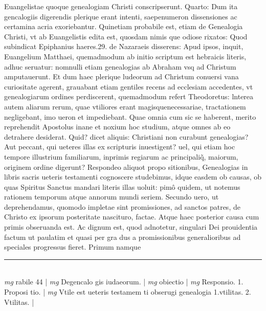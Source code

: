 \documentclass{article}
\begin{document}
\begin{pages}
Euangelistae quoque  genealogiam Christi conscripserunt. Quarto: Dum ita gencalogiis digerendis plerique  erant intenti, saepenumeron dissensiones ac certamina acria exoriebantur. Quinetiam probabile est, etiam de Genealogia Christi, vt ab Euangelistis edita est, quosdam nimis que  odiose rixatos: Quod subindicat Epiphanius haeres.29. de Nazaraeis disserens: Apud ipsos, inquit, Euangelium Matthaei, quemadmodum ab initio scriptum est hebraicis literis, adhuc seruatur: nomnulli etiam genealogias ab Abraham vsq ad Christum amputauerunt.  \pend\pstart Et dum haec plerique  ludeorum ad Christum conuersi vana curiositate agerent, grauabant etiam gentiles recens ad ecclesiam accedentes, vt genealogiarum ordines perdiscerent, quemadmodum refert Theodoretus: lnterea autem aliarum rerum, quae vtiliores erant magisquenecessariae, tractationem negligebant, imo ueron et impediebant. Quae omnia cum sic se haberent, merito reprehendit Apostolus inane et noxium hoc studium, atque omnes ab eo detrahere desiderat.  \pend\pstart Quid? dicet aliquis: Christiani non curabunt genealogias? Aut peccant, qui ueteres illas ex scripturis inuestigent? uel, qui etiam hoc tempore illustrium familiarum, inprimis regiarum ac principaliq̃, maiorum, originem ordine digerunt? Respondeo aliquot propo sitionibus, Genealogias in libris sacris ueteris testamenti cognoscere studebimus, idque  easdem ob causas, ob quas Spiritus Sanctus mandari literis illas uoluit: pimô quidem, ut notemus rationem temporum atque  annorum mundi seriem. Secundo uero, ut deprehendamus, quomodo impletae sint promissiones, ad sanctos patres, de Christo ex ipsorum posteritate nascituro, factae. Atque  haec posterior causa cum primis obseruanda est. Ac dignum est, quod adnotetur, singulari Dei prouidentia factum ut paulatim et quasi per gra dus a promissionibus generalioribus ad speciales progressus fieret. Primum namque   \pend
\vspace{0.5cm}\noindent
\vspace{0.2cm}\rule{1cm}{0.2pt}\\ 
\hspace{0.2cm}\textit{mg}
\footnotesize rabile 44 
\normalsize| 
\hspace{0.2cm}\textit{mg}
\footnotesize Degencalo gis iudaeorum. 
\normalsize| 
\hspace{0.2cm}\textit{mg}
\footnotesize obiectio 
\normalsize| 
\hspace{0.2cm}\textit{mg}
\footnotesize Responsio. 1. Proposi tio. 
\normalsize| 
\hspace{0.2cm}\textit{mg}
\footnotesize Vtile est ueteris testamem ti obserugi genealogia 1.vtilitas. 2. Vtilitas. 
\normalsize| 

\end{pages}
\end{document}
